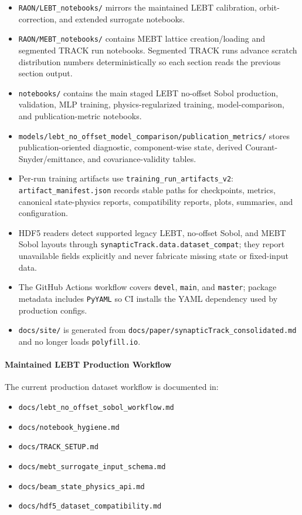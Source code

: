 \documentclass[
]{article}
\providecommand{\tightlist}{%
  \setlength{\itemsep}{0pt}\setlength{\parskip}{0pt}}
\begin{document}
\begin{itemize}
\tightlist
\item
  \texttt{RAON/LEBT\_notebooks/} mirrors the maintained LEBT
  calibration, orbit-correction, and extended surrogate notebooks.
\item
  \texttt{RAON/MEBT\_notebooks/} contains MEBT lattice creation/loading
  and segmented TRACK run notebooks. Segmented TRACK runs advance
  scratch distribution numbers deterministically so each section reads
  the previous section output.
\item
  \texttt{notebooks/} contains the main staged LEBT no-offset Sobol
  production, validation, MLP training, physics-regularized training,
  model-comparison, and publication-metric notebooks.
\item
  \texttt{models/lebt\_no\_offset\_model\_comparison/publication\_metrics/}
  stores publication-oriented diagnostic, component-wise state, derived
  Courant-Snyder/emittance, and covariance-validity tables.
\item
  Per-run training artifacts use \texttt{training\_run\_artifacts\_v2}:
  \texttt{artifact\_manifest.json} records stable paths for checkpoints,
  metrics, canonical state-physics reports, compatibility reports,
  plots, summaries, and configuration.
\item
  HDF5 readers detect supported legacy LEBT, no-offset Sobol, and MEBT
  Sobol layouts through \texttt{synapticTrack.data.dataset\_compat};
  they report unavailable fields explicitly and never fabricate missing
  state or fixed-input data.
\item
  The GitHub Actions workflow covers \texttt{devel}, \texttt{main}, and
  \texttt{master}; package metadata includes \texttt{PyYAML} so CI
  installs the YAML dependency used by production configs.
\item
  \texttt{docs/site/} is generated from
  \texttt{docs/paper/synapticTrack\_consolidated.md} and no longer loads
  \texttt{polyfill.io}.
\end{itemize}

\hypertarget{maintained-lebt-production-workflow}{%
\paragraph{Maintained LEBT Production
Workflow}\label{maintained-lebt-production-workflow}}

The current production dataset workflow is documented in:

\begin{itemize}
\tightlist
\item
  \texttt{docs/lebt\_no\_offset\_sobol\_workflow.md}
\item
  \texttt{docs/notebook\_hygiene.md}
\item
  \texttt{docs/TRACK\_SETUP.md}
\item
  \texttt{docs/mebt\_surrogate\_input\_schema.md}
\item
  \texttt{docs/beam\_state\_physics\_api.md}
\item
  \texttt{docs/hdf5\_dataset\_compatibility.md}
\end{itemize}
\end{document}
